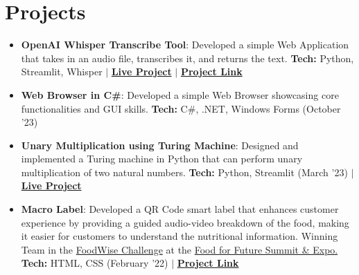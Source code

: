 \documentclass[a4paper,20pt]{article}
\newcommand{\resumeItem}[2] {
	\item\small{
		\textbf{#1}{: #2 \vspace{-2pt}}
	}
}
\newcommand{\resumeSubItem}[2]{\resumeItem{#1}{#2}\vspace{-3pt}}
\newcommand{\resumeSubHeadingListStart}{\begin{itemize}[leftmargin=*]}
\newcommand{\resumeSubHeadingListEnd}{\end{itemize}}
\begin{document}
\section{Projects}
	\resumeSubHeadingListStart
		\resumeSubItem{OpenAI Whisper Transcribe Tool}{Developed a simple Web Application that takes in an audio file, transcribes it, and returns the text. \textbf{Tech:} Python, Streamlit, Whisper $\vert$ \href{https://whisper-csk.streamlit.app/}{\textbf{Live Project}} $\vert$ \href{https://github.com/cr2007/whisper-streamlit}{\textbf{Project Link}}}
		\vspace{2pt}
		\resumeSubItem{Web Browser in C\#}{Developed a simple Web Browser showcasing core functionalities and GUI skills. \textbf{Tech:} C\#, .NET, Windows Forms (October '23)}
		\vspace{2pt}
		\resumeSubItem{Unary Multiplication using Turing Machine}{Designed and implemented a Turing machine in Python that can perform unary multiplication of two natural numbers. \textbf{Tech:} Python, Streamlit (March '23) $\vert$ \href{https://f29fb-assignment.streamlit.app/}{\textbf{Live Project}}}
		\vspace{2pt}
		\resumeSubItem{Macro Label}{Developed a QR Code smart label that enhances customer experience by providing a guided audio-video breakdown of the food, making it easier for customers to understand the nutritional information. Winning Team in the \href{https://www.foodforfuturesummit.com/foodwise}{FoodWise Challenge} at the \href{https://www.foodforfuturesummit.com/}{Food for Future Summit \& Expo.} \textbf{Tech:} HTML, CSS (February '22) $\vert$ \href{https://github.com/cr2007/foodqrcode}{\textbf{Project Link}}}
		\vspace{2pt}
	\resumeSubHeadingListEnd
	\vspace{-5pt}
\vspace{2pt}
\end{document}
